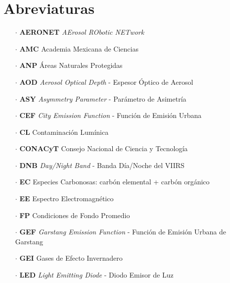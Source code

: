 \chapter{Abreviaturas}

\begin{itemize}

\item[$\cdot$] \textbf{AERONET} \textit{AErosol RObotic NETwork}

\item[$\cdot$] \textbf{AMC} Academia Mexicana de Ciencias

\item[$\cdot$] \textbf{ANP} Áreas Naturales Protegidas

\item[$\cdot$] \textbf{AOD} \textit{Aerosol Optical Depth} - Espesor Óptico de Aerosol

\item[$\cdot$] \textbf{ASY} \textit{Asymmetry Parameter} - Parámetro de Asimetría

\item[$\cdot$] \textbf{CEF} \textit{City Emission Function} - Función de Emisión Urbana

\item[$\cdot$] \textbf{CL} Contaminación Lumínica

\item[$\cdot$] \textbf{CONACyT} Consejo Nacional de Ciencia y Tecnología

\item[$\cdot$] \textbf{DNB} \textit{Day/Night Band} - Banda Día/Noche del VIIRS

\item[$\cdot$] \textbf{EC} Especies Carbonosas: carbón elemental + carbón orgánico

\item[$\cdot$] \textbf{EE} Espectro Electromagnético

\item[$\cdot$] \textbf{FP} Condiciones de Fondo Promedio

\item[$\cdot$] \textbf{GEF} \textit{Garstang Emission Function} - Función de Emisión Urbana de Garstang

\item[$\cdot$] \textbf{GEI} Gases de Efecto Invernadero

\item[$\cdot$] \textbf{LED} \textit{Light Emitting Diode} - Diodo Emisor de Luz


\end{itemize}
